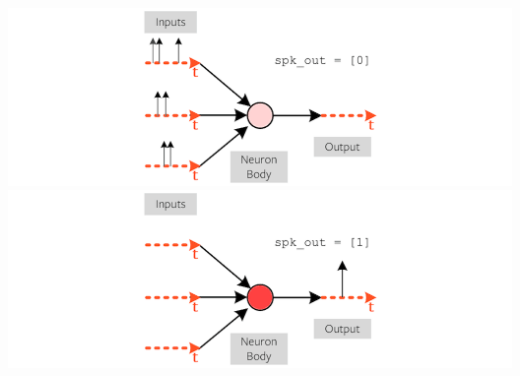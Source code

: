 \documentclass[11pt]{article}
\begin{document}
\begin{center}
  \includegraphics[scale=0.3]{image/def1.png}
  \includegraphics[scale=0.3]{image/def2.png}
\end{center}
\end{document}
